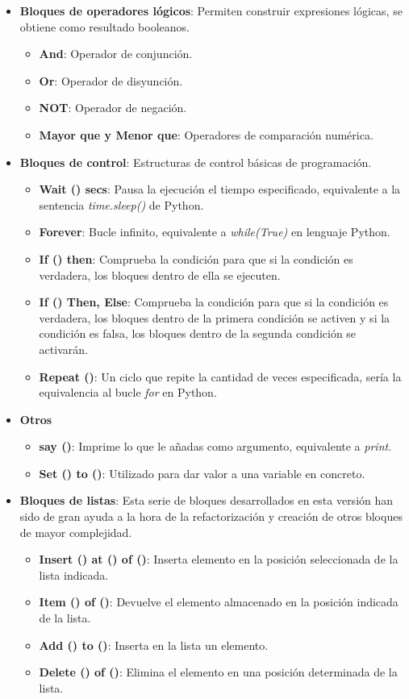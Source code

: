 \begin{itemize}
\item \textbf{Bloques de operadores lógicos}:
Permiten construir expresiones lógicas, se obtiene como resultado booleanos.
\begin{itemize}

 \item \textbf{And}: Operador de conjunción.
 \item \textbf{Or}: Operador de disyunción.
 \item \textbf{NOT}: Operador de negación.
 \item \textbf{Mayor que y Menor que}: Operadores de comparación numérica.
\end{itemize}

\item \textbf{Bloques de control}:
Estructuras de control básicas de programación.
\begin{itemize}
\item \textbf{Wait () secs}: Pausa la ejecución el tiempo especificado, equivalente a la sentencia \textit{time.sleep()} de Python.
\item \textbf{Forever}: Bucle infinito, equivalente a \textit{while(True)} en lenguaje Python.
\item \textbf{If () then}: Comprueba la condición para que si la condición es verdadera, los bloques dentro de ella se ejecuten.
\item \textbf{If () Then, Else}: Comprueba la condición para que si la condición es verdadera, los bloques dentro de la primera condición se activen y si la condición es falsa, los bloques dentro de la segunda condición se activarán.
\item \textbf{Repeat ()}: Un ciclo que repite la cantidad de veces especificada, sería la equivalencia al bucle \textit{for} en Python.
\end{itemize}
\item \textbf{Otros}
\begin{itemize}

\item \textbf{say ()}: Imprime lo que le añadas como argumento, equivalente a \textit{print}.
\item \textbf{Set () to ()}: Utilizado para dar valor a una variable en concreto.
\end{itemize}

\item \textbf{Bloques de listas}:
Esta serie de bloques desarrollados en esta versión han sido de gran ayuda a la hora de la refactorización y creación de otros bloques de mayor complejidad.
\begin{itemize}
\item \textbf{Insert () at () of ()}: Inserta elemento en la posición seleccionada de la lista indicada.
\item \textbf{Item () of ()}: Devuelve el elemento almacenado en la posición indicada de la lista.
\item \textbf{Add () to ()}: Inserta en la lista un elemento.
\item \textbf{Delete () of ()}: Elimina el elemento en una posición determinada de la lista.
\end{itemize}
\end{itemize}

